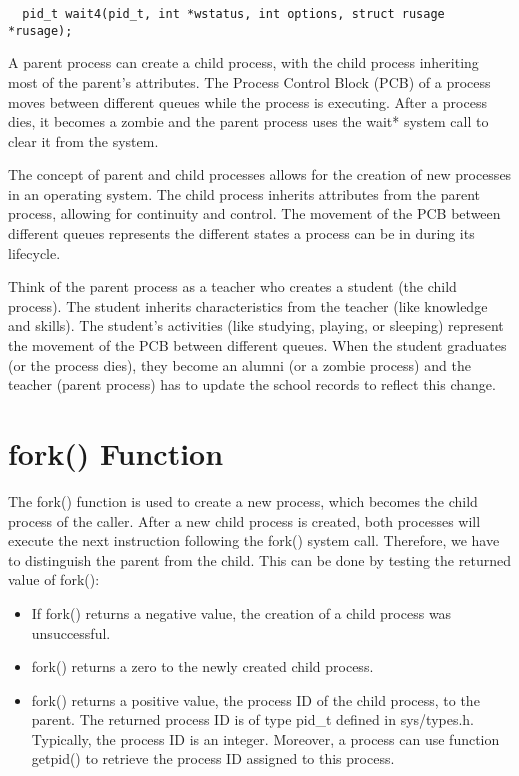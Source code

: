 \documentclass[12pt]{report}
\begin{document}
  \begin{lstlisting}  pid_t wait4(pid_t, int *wstatus, int options, struct rusage *rusage);  \end{lstlisting}  
  \begin{tcolorbox}[colback=yellow!5, colframe=yellow!80!black, title={\faBookmark Key Points}]  A parent process can create a child process, with the child process inheriting most of the parent's attributes. The Process Control Block (PCB) of a process moves between different queues while the process is executing. After a process dies, it becomes a zombie and the parent process uses the wait* system call to clear it from the system.  \end{tcolorbox}  
  \begin{tcolorbox}[colback=green!5, colframe=green!75!black, title={\faLightbulb Intuition}]  The concept of parent and child processes allows for the creation of new processes in an operating system. The child process inherits attributes from the parent process, allowing for continuity and control. The movement of the PCB between different queues represents the different states a process can be in during its lifecycle.  \end{tcolorbox}  
  \begin{tcolorbox}[colback=blue!5, colframe=blue!75!black, title={\faLightbulb Simple Explanation}]  Think of the parent process as a teacher who creates a student (the child process). The student inherits characteristics from the teacher (like knowledge and skills). The student's activities (like studying, playing, or sleeping) represent the movement of the PCB between different queues. When the student graduates (or the process dies), they become an alumni (or a zombie process) and the teacher (parent process) has to update the school records to reflect this change.  \end{tcolorbox}  

\section{fork() Function} 
 The fork() function is used to create a new process, which becomes the child process of the caller. After a new child process is created, both processes will execute the next instruction following the fork() system call. Therefore, we have to distinguish the parent from the child. This can be done by testing the returned value of fork(): 
 \begin{itemize} 
 \item If fork() returns a negative value, the creation of a child process was unsuccessful. 
 \item fork() returns a zero to the newly created child process. 
 \item fork() returns a positive value, the process ID of the child process, to the parent. The returned process ID is of type pid\_t defined in sys/types.h. Typically, the process ID is an integer. Moreover, a process can use function getpid() to retrieve the process ID assigned to this process. 
 \end{itemize} 
\end{document}
